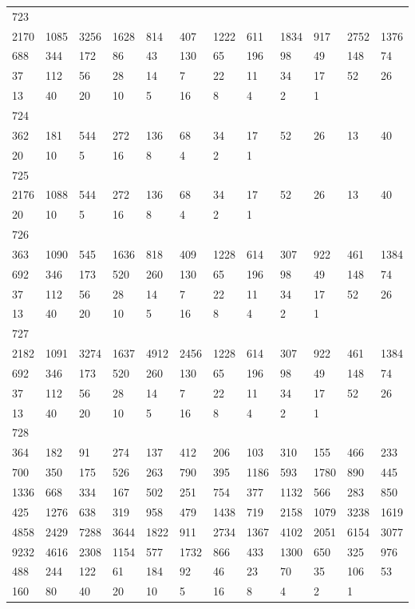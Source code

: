 \begin{longtable}{llllllllllll}
723&&&&&&&&&&&\\
2170& 1085& 3256& 1628& 814& 407& 1222& 611& 1834& 917& 2752& 1376\\
688& 344& 172& 86& 43& 130& 65& 196& 98& 49& 148& 74\\
37& 112& 56& 28& 14& 7& 22& 11& 34& 17& 52& 26\\
13& 40& 20& 10& 5& 16& 8& 4& 2& 1& \\

724&&&&&&&&&&&\\
362& 181& 544& 272& 136& 68& 34& 17& 52& 26& 13& 40\\
20& 10& 5& 16& 8& 4& 2& 1& \\

725&&&&&&&&&&&\\
2176& 1088& 544& 272& 136& 68& 34& 17& 52& 26& 13& 40\\
20& 10& 5& 16& 8& 4& 2& 1& \\

726&&&&&&&&&&&\\
363& 1090& 545& 1636& 818& 409& 1228& 614& 307& 922& 461& 1384\\
692& 346& 173& 520& 260& 130& 65& 196& 98& 49& 148& 74\\
37& 112& 56& 28& 14& 7& 22& 11& 34& 17& 52& 26\\
13& 40& 20& 10& 5& 16& 8& 4& 2& 1& \\

727&&&&&&&&&&&\\
2182& 1091& 3274& 1637& 4912& 2456& 1228& 614& 307& 922& 461& 1384\\
692& 346& 173& 520& 260& 130& 65& 196& 98& 49& 148& 74\\
37& 112& 56& 28& 14& 7& 22& 11& 34& 17& 52& 26\\
13& 40& 20& 10& 5& 16& 8& 4& 2& 1& \\

728&&&&&&&&&&&\\
364& 182& 91& 274& 137& 412& 206& 103& 310& 155& 466& 233\\
700& 350& 175& 526& 263& 790& 395& 1186& 593& 1780& 890& 445\\
1336& 668& 334& 167& 502& 251& 754& 377& 1132& 566& 283& 850\\
425& 1276& 638& 319& 958& 479& 1438& 719& 2158& 1079& 3238& 1619\\
4858& 2429& 7288& 3644& 1822& 911& 2734& 1367& 4102& 2051& 6154& 3077\\
9232& 4616& 2308& 1154& 577& 1732& 866& 433& 1300& 650& 325& 976\\
488& 244& 122& 61& 184& 92& 46& 23& 70& 35& 106& 53\\
160& 80& 40& 20& 10& 5& 16& 8& 4& 2& 1& \\


\end{longtable}
